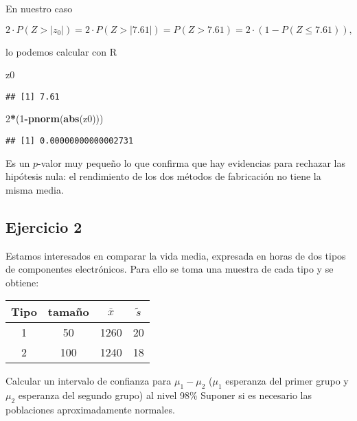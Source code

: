 \documentclass[
]{article}
\newenvironment{Shaded}{\begin{snugshade}}{\end{snugshade}}
\newcommand{\DecValTok}[1]{\textcolor[rgb]{0.00,0.00,0.81}{#1}}
\newcommand{\KeywordTok}[1]{\textcolor[rgb]{0.13,0.29,0.53}{\textbf{#1}}}
\newcommand{\NormalTok}[1]{#1}
\newcommand{\OperatorTok}[1]{\textcolor[rgb]{0.81,0.36,0.00}{\textbf{#1}}}
\begin{document}
En nuestro caso

\[2\cdot P(Z>|z_0|)= 2\cdot P(Z>|7.61|)=P(Z>7.61)=2\cdot(1-P(Z\leq 7.61 )),\]

lo podemos calcular con R

\begin{Shaded}
\begin{Highlighting}[]
\NormalTok{z0}
\end{Highlighting}
\end{Shaded}

\begin{verbatim}
## [1] 7.61
\end{verbatim}

\begin{Shaded}
\begin{Highlighting}[]
\DecValTok{2}\OperatorTok{*}\NormalTok{(}\DecValTok{1}\OperatorTok{{-}}\KeywordTok{pnorm}\NormalTok{(}\KeywordTok{abs}\NormalTok{(z0)))}
\end{Highlighting}
\end{Shaded}

\begin{verbatim}
## [1] 0.00000000000002731
\end{verbatim}

Es un \(p\)-valor muy pequeño lo que confirma que hay evidencias para
rechazar las hipótesis nula: el rendimiento de los dos métodos de
fabricación no tiene la misma media.

\hypertarget{ejercicio-2}{%
\subsection{Ejercicio 2}\label{ejercicio-2}}

Estamos interesados en comparar la vida media, expresada en horas de dos
tipos de componentes electrónicos. Para ello se toma una muestra de cada
tipo y se obtiene:

\begin{center}
\begin{tabular}{|c|c|c|c|}
\hline Tipo & tamaño & $\overline{x}$ & $\tilde{s}$\\ \hline \hline 1 & 50 & 1260 & 20\\ \hline 2 &
100 & 1240 & 18\\ \hline
\end{tabular}
\end{center}

Calcular un intervalo de confianza para \(\mu_{1}-\mu_{2}\) (\(\mu_{1}\)
esperanza del primer grupo y \(\mu_{2}\) esperanza del segundo grupo) al
nivel 98\% Suponer si es necesario las poblaciones aproximadamente
normales.
\end{document}

